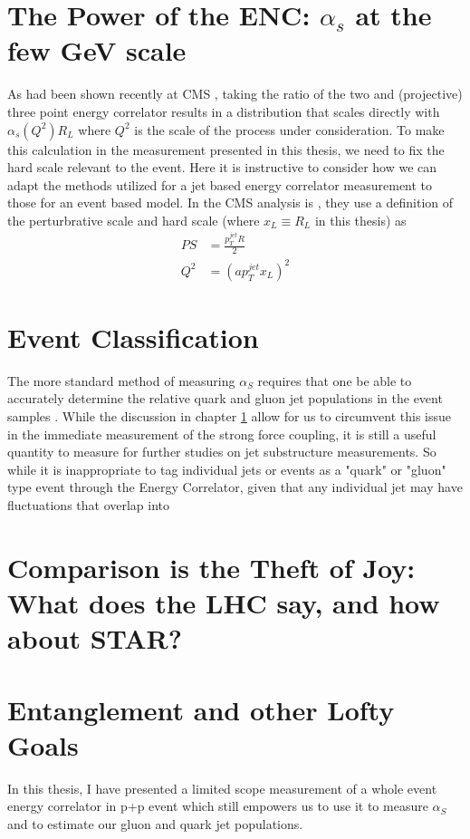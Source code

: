 \documentclass[letterpaper, 12pt, oneside]{book}
\theoremstyle{definition}
\begin{document}
\chapter{The Power of the ENC: $\alpha_s$ at the few GeV scale}
\label{ch:alphas}
	As had been shown recently at CMS \cite{CMS_alphaS}, taking the ratio of the two and (projective) three point energy correlator results in a distribution that scales directly with $\alpha_s(Q^2) R_L $ where $Q^2$ is the scale of the process under consideration. 
	To make this calculation in the measurement presented in this thesis, we need to fix the hard scale relevant to the event. 
	Here it is instructive to consider how we can adapt the methods utilized for a jet based energy correlator measurement to those for an event based model. 
	In the CMS analysis is \cite{CMS_alphaS}, they use a definition of the perturbrative scale and hard scale (where $x_L \equiv R_L$ in this thesis) as
	\begin{equation}
		\begin{split}
			PS &= \frac{p^{jet}_{T}R}{2} \\
			Q^2 &=\left(a p_{T}^{jet} x_L \right)^2 
		\end{split}
	\end{equation}
	
\chapter{Event Classification} 
\label{ch:qgdiscr}
	The more standard method of measuring $\alpha_S$ requires that one be able to accurately determine the relative quark and gluon jet populations in the event samples \cite{LeBlanc2023}. 
	While the discussion in chapter \ref{ch:alphas} allow for us to circumvent this issue in the immediate measurement of the strong force coupling, it is still a useful quantity to measure for further studies on jet substructure measurements.
	So while it is inappropriate to tag individual jets or events as a "quark" or "gluon" type event through the Energy Correlator, given that any individual jet may have fluctuations that overlap into 
\chapter{Comparison is the Theft of Joy: What does the LHC say, and how about STAR?}
\chapter{Entanglement and other Lofty Goals}
\label{ch:too_much}
	In this thesis, I have presented a limited scope measurement of a whole event energy correlator in p+p event which still empowers us to use it to measure $\alpha_S$ and to estimate our gluon and quark jet populations. 
\end{document}
